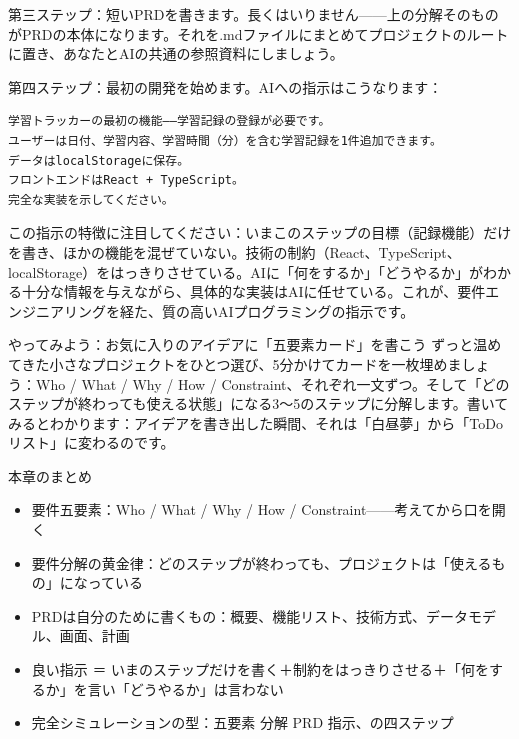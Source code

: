 第三ステップ：短いPRDを書きます。長くはいりません——上の分解そのものがPRDの本体になります。それを.mdファイルにまとめてプロジェクトのルートに置き、あなたとAIの共通の参照資料にしましょう。

第四ステップ：最初の開発を始めます。AIへの指示はこうなります：

\begin{lstlisting}
学習トラッカーの最初の機能——学習記録の登録が必要です。
ユーザーは日付、学習内容、学習時間（分）を含む学習記録を1件追加できます。
データはlocalStorageに保存。
フロントエンドはReact + TypeScript。
完全な実装を示してください。
\end{lstlisting}

この指示の特徴に注目してください：いまこのステップの目標（記録機能）だけを書き、ほかの機能を混ぜていない。技術の制約（React、TypeScript、localStorage）をはっきりさせている。AIに「何をするか」「どうやるか」がわかる十分な情報を与えながら、具体的な実装はAIに任せている。これが、要件エンジニアリングを経た、質の高いAIプログラミングの指示です。

\begin{tcbpractice}{やってみよう：お気に入りのアイデアに「五要素カード」を書こう}
ずっと温めてきた小さなプロジェクトをひとつ選び、5分かけてカードを一枚埋めましょう：Who / What / Why / How / Constraint、それぞれ一文ずつ。そして「どのステップが終わっても使える状態」になる3〜5のステップに分解します。書いてみるとわかります：アイデアを書き出した瞬間、それは「白昼夢」から「ToDoリスト」に変わるのです。

\end{tcbpractice}

\begin{tcbsummary}{本章のまとめ}
\begin{itemize}
  \item 要件五要素：Who / What / Why / How / Constraint——考えてから口を開く
  \item 要件分解の黄金律：どのステップが終わっても、プロジェクトは「使えるもの」になっている
  \item PRDは自分のために書くもの：概要、機能リスト、技術方式、データモデル、画面、計画
  \item 良い指示 ＝ いまのステップだけを書く＋制約をはっきりさせる＋「何をするか」を言い「どうやるか」は言わない
  \item 完全シミュレーションの型：五要素 分解 PRD 指示、の四ステップ
\end{itemize}

\end{tcbsummary}
